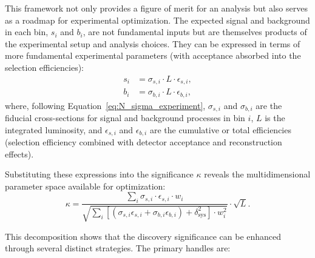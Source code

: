 This framework not only provides a figure of merit for an analysis but also serves as a roadmap for experimental optimization. The expected signal and background in each bin, $s_i$ and $b_i$, are not fundamental inputs but are themselves products of the experimental setup and analysis choices. They can be expressed in terms of more fundamental experimental parameters (with acceptance absorbed into the selection efficiencies):
\begin{align*}
    s_i &= \sigma_{s,i} \cdot L \cdot \epsilon_{s,i}, \\
    b_i &= \sigma_{b,i} \cdot L \cdot \epsilon_{b,i},
\end{align*}
where, following Equation~\ref{eq:N_sigma_experiment}, $\sigma_{s,i}$ and $\sigma_{b,i}$ are the fiducial cross-sections for signal and background processes in bin $i$, $L$ is the integrated luminosity, and $\epsilon_{s,i}$ and $\epsilon_{b,i}$ are the cumulative or total efficiencies (selection efficiency combined with detector acceptance and reconstruction effects).

Substituting these expressions into the significance $\kappa$ reveals the multidimensional parameter space available for optimization:
\[
\kappa = \frac{\sum_i \sigma_{s,i} \cdot \epsilon_{s,i} \cdot w_i}
{\sqrt{\sum_i \left[ (\sigma_{s,i}\epsilon_{s,i} + \sigma_{b,i}\epsilon_{b,i}) + \delta^2_{\text{sys}} \right] \cdot w_i^2}} \cdot \sqrt{L}.
\]

This decomposition shows that the discovery significance can be enhanced through several distinct strategies. The primary handles are:

